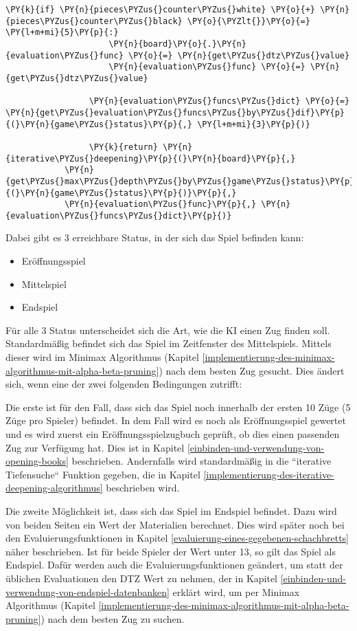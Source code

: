 \begin{Verbatim}[commandchars=\\\{\}]
                 \PY{k}{if} \PY{n}{pieces\PYZus{}counter\PYZus{}white} \PY{o}{+} \PY{n}{pieces\PYZus{}counter\PYZus{}black} \PY{o}{\PYZlt{}}\PY{o}{=} \PY{l+m+mi}{5}\PY{p}{:}
                     \PY{n}{board}\PY{o}{.}\PY{n}{evaluation\PYZus{}func} \PY{o}{=} \PY{n}{get\PYZus{}dtz\PYZus{}value}
                     \PY{n}{evaluation\PYZus{}func} \PY{o}{=} \PY{n}{get\PYZus{}dtz\PYZus{}value}
                 
                 \PY{n}{evaluation\PYZus{}funcs\PYZus{}dict} \PY{o}{=} \PY{n}{get\PYZus{}evaluation\PYZus{}funcs\PYZus{}by\PYZus{}dif}\PY{p}{(}\PY{n}{game\PYZus{}status}\PY{p}{,} \PY{l+m+mi}{3}\PY{p}{)}
         
                 \PY{k}{return} \PY{n}{iterative\PYZus{}deepening}\PY{p}{(}\PY{n}{board}\PY{p}{,} 
			\PY{n}{get\PYZus{}max\PYZus{}depth\PYZus{}by\PYZus{}game\PYZus{}status}\PY{p}{(}\PY{n}{game\PYZus{}status}\PY{p}{)}\PY{p}{,} 
			\PY{n}{evaluation\PYZus{}func}\PY{p}{,} \PY{n}{evaluation\PYZus{}funcs\PYZus{}dict}\PY{p}{)}
\end{Verbatim}

    Dabei gibt es 3 erreichbare Status, in der sich das Spiel befinden kann:

\begin{itemize}
\tightlist
\item
  Eröffnungsspiel
\item
  Mittelspiel
\item
  Endspiel
\end{itemize}

Für alle 3 Status unterscheidet sich die Art, wie die KI einen Zug
finden soll. Standardmäßig befindet sich das Spiel im Zeitfenster des
Mittelspiels. Mittels dieser wird im Minimax
Algorithmus (Kapitel \ref{implementierung-des-minimax-algorithmus-mit-alpha-beta-pruning}) nach dem besten Zug gesucht. Dies ändert sich, wenn
eine der zwei folgenden Bedingungen zutrifft:

Die erste ist für den Fall, dass sich das Spiel noch innerhalb der
ersten 10 Züge (5 Züge pro Spieler) befindet. In dem Fall wird es noch
als Eröffnungsspiel gewertet und es wird zuerst ein
Eröffnungsspielzugbuch geprüft, ob dies einen passenden Zug zur
Verfügung hat. Dies ist in Kapitel \ref{einbinden-und-verwendung-von-opening-books} beschrieben. Andernfalls wird
standardmäßig in die ``iterative Tiefensuche`` Funktion gegeben, die in
Kapitel \ref{implementierung-des-iterative-deepening-algorithmus} beschrieben wird.

Die zweite Möglichkeit ist, dass sich das Spiel im Endspiel befindet.
Dazu wird von beiden Seiten ein Wert der Materialien berechnet. Dies
wird später noch bei den Evaluierungsfunktionen in Kapitel \ref{evaluierung-eines-gegebenen-schachbretts} näher
beschrieben. Ist für beide Spieler der Wert unter 13, so gilt das Spiel
als Endspiel. Dafür werden auch die Evaluierungsfunktionen geändert, um
statt der üblichen Evaluationen den DTZ Wert zu nehmen, der in Kapitel
\ref{einbinden-und-verwendung-von-endspiel-datenbanken} erklärt wird, um per Minimax Algorithmus (Kapitel \ref{implementierung-des-minimax-algorithmus-mit-alpha-beta-pruning}) nach dem besten
Zug zu suchen.

